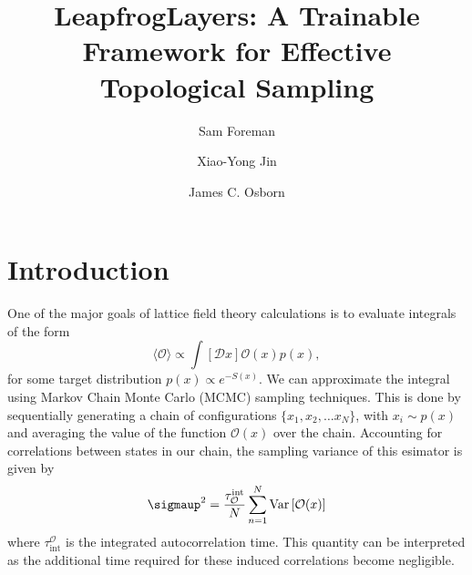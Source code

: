 \documentclass[a4paper,11pt]{article}
\title{LeapfrogLayers: A Trainable Framework for Effective Topological Sampling}
\author*[a]{Sam Foreman}
\author[a]{Xiao-Yong Jin}
\author[a]{James C. Osborn}
\affiliation[a]{Argonne National Laboratory,\\
  Lemont, IL}
\begin{document}
\maketitle


\section{\label{sec:intro}Introduction}
%
One of the major goals of lattice field theory calculations is to evaluate
integrals of the form
%
\begin{equation}
    \langle \mathcal{O} \rangle \propto \int \left[ \mathcal{D} x \right] \mathcal{O}(x) p(x),
    \label{eq:density_integral}
\end{equation}
%
for some target distribution \(p(x)\propto e^{-S(x)}\).
%
We can approximate the integral using Markov Chain Monte Carlo (MCMC) sampling
techniques.
%
This is done by sequentially generating a chain of configurations \(\{x_{1},
x_{2}, \ldots x_{N}\}\), with \(x_{i} \sim p(x)\) and averaging the value of
the function \(\mathcal{O}(x)\) over the chain.
%
Accounting for correlations between states in our chain, the sampling variance
of this esimator is given by
%
\begin{equation}
    \sigmaup^{2} = \frac{\tau_{\mathcal{O}}^{\mathrm{int}}}{N}\sum_{n=1}^{N} \mathrm{Var}\left[\mathcal{O}(x)\right]
\end{equation}
%
where \(\tau_{\mathrm{int}}^{\mathcal{O}}\) is the integrated autocorrelation
time.
%
This quantity can be interpreted as the additional time required for
these induced correlations become negligible.
%
\end{document}
